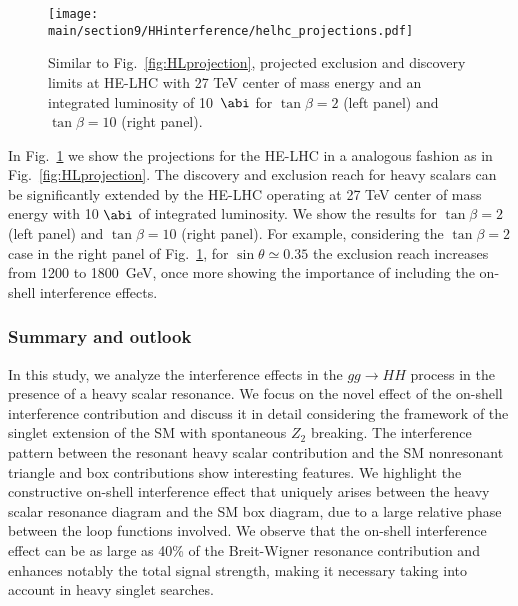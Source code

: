 \begin{figure}[t]
  \centering
\texttt{[image: \\main/section9/HHinterference/helhc\_projections.pdf]}
  \caption{
  Similar to Fig.~\ref{fig:HLprojection}, projected exclusion and discovery limits at HE-LHC with 27 TeV center of mass energy and an integrated luminosity of 10~$\abi$ for $\tan\beta=2$ (left panel) and $\tan\beta=10$ (right panel).
  }
  \label{fig:HEprojection}
\end{figure} 

In Fig.~\ref{fig:HEprojection} we show the projections for the HE-LHC in a analogous fashion as in Fig.~\ref{fig:HLprojection}. The discovery and exclusion reach for heavy scalars can be significantly extended by the HE-LHC operating at 27 TeV center of mass energy with 10 $\abi$ of integrated luminosity. We show the results for $\tan\beta=2$ (left panel) and $\tan\beta=10$ (right panel). 
For example, considering the $\tan\beta=2$ case in the right panel of Fig.~\ref{fig:HEprojection}, for $\sin\theta\simeq 0.35$ the exclusion reach increases from 1200 to 1800~GeV, once more showing the importance of including the on-shell interference effects.

\subsubsection*{Summary and outlook}
\label{sec:conclude}

In this study, we analyze the interference effects in the $gg\to HH$ process in the presence of a heavy scalar resonance.
We focus on the novel effect of the on-shell interference contribution and discuss it in detail considering the framework of the singlet extension of the SM with spontaneous $Z_2$ breaking. %
The interference pattern between the resonant heavy scalar contribution and the SM nonresonant triangle and box contributions show interesting features. 
We highlight the constructive on-shell interference effect that uniquely arises between the heavy scalar resonance diagram and the SM box diagram, due to a large relative phase between the loop functions involved.
We observe that the on-shell interference effect can be as large as 40\% of the Breit-Wigner resonance contribution and enhances notably the total signal strength, making it necessary taking into account in heavy singlet searches.

